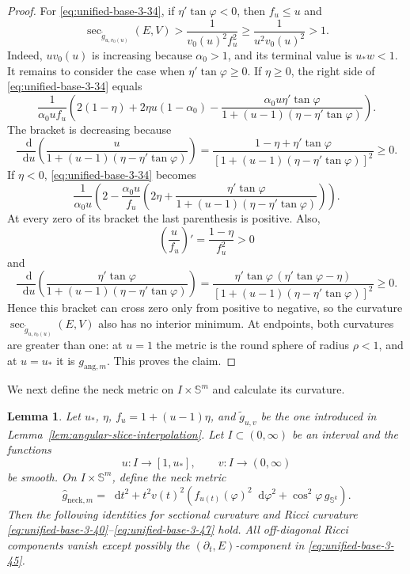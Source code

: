 \documentclass[11pt,reqno]{amsart}
\newtheorem{lemma}[theorem]{Lemma}
\theoremstyle{definition}
\numberwithin{equation}{section}
\newcommand{\dd}{\mathop{}\!\mathrm d}
\begin{document}
\begin{proof}
For \eqref{eq:unified-base-3-34}, if
$\eta'\tan\varphi<0$, then $f_u\le u$ and
\begin{equation}
\sec_{\widetilde g_{u,v_0(u)}}(E,V)
 >\frac1{v_0(u)^2f_u^2}
 \ge\frac1{u^2v_0(u)^2}>1.                                      \label{eq:unified-base-3-36}
\end{equation}
Indeed, $uv_0(u)$ is increasing because $\alpha_0>1$, and its terminal
value is $u_*w<1$.  It remains to consider the case when
$\eta'\tan\varphi\ge0$.  If $\eta\ge0$, the right side of
\eqref{eq:unified-base-3-34} equals
\begin{equation}
\frac1{\alpha_0uf_u}\left(
 2(1-\eta)+2\eta u(1-\alpha_0)
  -\frac{\alpha_0u\eta'\tan\varphi}
         {1+(u-1)(\eta-\eta'\tan\varphi)}\right).                \label{eq:unified-base-3-37}
\end{equation}
The bracket is decreasing because
\[
 \frac{\dd}{\dd u}\left(
   \frac u{1+(u-1)(\eta-\eta'\tan\varphi)}\right)
 =\frac{1-\eta+\eta'\tan\varphi}
        {[1+(u-1)(\eta-\eta'\tan\varphi)]^2}\ge0.
\]
If $\eta<0$, \eqref{eq:unified-base-3-34} becomes
\begin{equation}
\frac1{\alpha_0u}\left(
 2-\frac{\alpha_0u}{f_u}\left(
  2\eta+\frac{\eta'\tan\varphi}
    {1+(u-1)(\eta-\eta'\tan\varphi)}\right)\right).             \label{eq:unified-base-3-38}
\end{equation}
At every zero of its bracket the last parenthesis is positive.  Also,
\[
 \left(\frac u{f_u}\right)'=\frac{1-\eta}{f_u^2}>0
\]
and
\[
 \frac{\dd}{\dd u}\left(
   \frac{\eta'\tan\varphi}
        {1+(u-1)(\eta-\eta'\tan\varphi)}\right)
 =\frac{\eta'\tan\varphi\,(\eta'\tan\varphi-\eta)}
        {[1+(u-1)(\eta-\eta'\tan\varphi)]^2}\ge0.
\]
Hence this bracket can cross zero only from positive to negative, so
the curvature $\sec_{\widetilde g_{u,v_0(u)}}(E,V)$ also has no interior minimum.  At  endpoints, both curvatures are greater than one: at $u=1$ the metric is the round
sphere of radius $\rho<1$, and at $u=u_*$ it is
$g_{\mathrm{ang},m}$.  This proves the claim.
\end{proof}


We next define the neck metric on $I\times \mathbb S^m$ and calculate its curvature.
\begin{lemma}\label{lem:variable-angular-ricci}
Let \(u_*\), \(\eta\), \(f_u=1+(u-1)\eta\), and
\(\widetilde g_{u,v}\) be the one introduced in
Lemma~\ref{lem:angular-slice-interpolation}.  Let
\(I\subset(0,\infty)\) be an interval and the functions
\[
 u:I\longrightarrow[1,u_*],\qquad v:I\longrightarrow(0,\infty)
\]
be smooth.  On \(I\times\mathbb S^m\), define the neck metric
\begin{equation}
\widehat g_{\mathrm{neck},m}=\dd t^2+t^2v(t)^2\left(
 f_{u(t)}(\varphi)^2\dd\varphi^2
 +\cos^2\varphi\,g_{\mathbb S^k}\right).                         \label{eq:unified-base-3-39}
\end{equation}
Then the following identities for sectional curvature and Ricci curvature
\eqref{eq:unified-base-3-40}--\eqref{eq:unified-base-3-47} hold.
All off-diagonal Ricci components vanish except possibly the
\((\partial_t,E)\)-component in
\eqref{eq:unified-base-3-45}.
\end{lemma}
\end{document}
